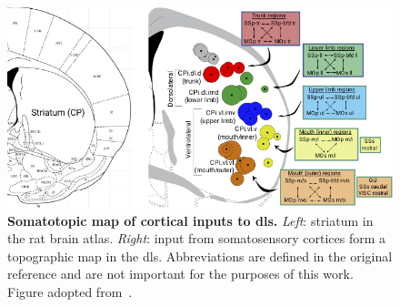 \begin{figure}[bth!]
  \begin{center}
    \includegraphics[width=1\linewidth]{ch-intro/figures/StriatumInputMap}
    \caption[Map of Cortical Inputs to DLS]
    {\textbf{Somatotopic map of cortical inputs to \gls{dls}.}
    \textit{Left}: striatum in the rat brain atlas.
    \textit{Right}: input from somatosensory cortices form a topographic map in the \gls{dls}.
    Abbreviations are defined in the original reference and are not important for the purposes of this work.
    Figure adopted from~\cite{Hintiryan2016NN}.
    }
    \label{fig:intro:InputMap}
  \end{center}
\end{figure}